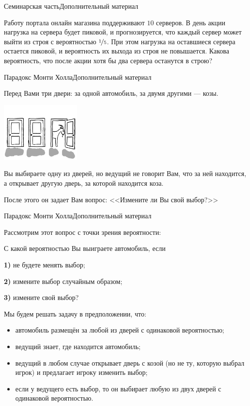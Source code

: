 \begin{frame}{Семинарская часть}{Дополнительный материал}

\zh Работу портала онлайн магазина поддерживают $10$ серверов. В день акции нагрузка на сервера будет пиковой, и прогнозируется, что каждый сервер может выйти из строя с вероятностью $\nicefrac{1}{5}$. При этом нагрузка на оставшиеся сервера остается пиковой, и вероятность их выхода из строя не повышается. Какова вероятность, что после акции хотя бы два сервера останутся в строю?

\end{frame}

\begin{frame}{Парадокс Монти Холла}{Дополнительный материал}

Перед Вами три двери: за одной автомобиль, за двумя другими --- козы.

\vspace{-2mm}
\begin{center}
\includegraphics[width=40mm]{img/doors1-2.png}
\end{center}

Вы выбираете одну из дверей, но ведущий не говорит Вам, что за ней находится, а открывает другую дверь, за которой находится коза.

После этого он задает Вам вопрос: <<Измените ли Вы свой выбор?>>


\end{frame}


\begin{frame}{Парадокс Монти Холла}{Дополнительный материал}


Рассмотрим этот вопрос с точки зрения вероятности:

\z С какой вероятностью Вы выиграете автомобиль, если

{\bf 1)} не будете менять выбор;

{\bf 2)} измените выбор случайным образом;

{\bf 3)} измените свой выбор?



Мы будем решать задачу в предположении, что:

\begin{itemize}
\item автомобиль размещён за любой из дверей с одинаковой вероятностью;
\item ведущий знает, где находится автомобиль;
\item ведущий в любом случае открывает дверь с козой (но не ту, которую выбрал игрок) и предлагает игроку изменить выбор;
\item если у ведущего есть выбор, то он выбирает любую из двух дверей с одинаковой вероятностью.

\end{itemize}


\end{frame}


